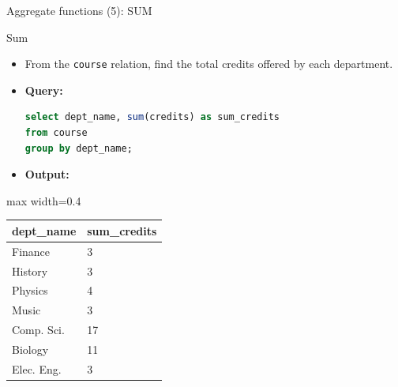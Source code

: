 \documentclass[aspectratio=169, xcolor=dvipsnames]{beamer}
\begin{document}
\begin{frame}[fragile]{Aggregate functions (5): SUM}
    \begin{block}{Sum}
        \begin{itemize}[<+->]
            \item From the \texttt{course} relation, find the total credits offered by each department.
            \item \textbf{Query:}
            \begin{lstlisting}[language=SQL]
select dept_name, sum(credits) as sum_credits 
from course 
group by dept_name;
            \end{lstlisting}
            \item \textbf{Output:}
        \end{itemize}
    \end{block}
    \begin{center}
        \begin{adjustbox}{max width=0.4\textwidth}
        \begin{tabular}{|l|l|}
        \hline
        \textbf{dept\_name} & \textbf{sum\_credits} \\ \hline
        Finance & 3 \\ \hline
        History & 3 \\ \hline
        Physics & 4 \\ \hline
        Music & 3 \\ \hline
        Comp. Sci. & 17 \\ \hline
        Biology & 11 \\ \hline
        Elec. Eng. & 3 \\ \hline
        \end{tabular}
        \end{adjustbox}
    \end{center}
\end{frame}
\end{document}
